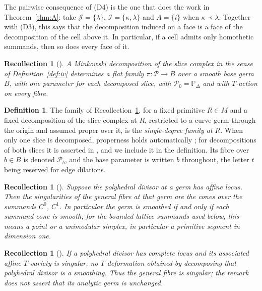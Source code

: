 \documentclass[11pt]{amsart}
\newtheorem{recollection}[theorem]{Recollection}
\theoremstyle{definition}
\newtheorem{definition}[theorem]{Definition}
\theoremstyle{remark}
\theoremstyle{plain}
\newcommand{\PP}{\mathbb{P}}
\newcommand{\cP}{\mathcal{P}}
\begin{document}
The pairwise consequence of (D4) is the one that does the work in
Theorem~\ref{thm:A}: take $\mathcal J=\{\lambda\}$,
$\mathcal I=\{\kappa,\lambda\}$ and $A=\{i\}$ when
$\kappa\prec\lambda$.  Together with (D3), this says that the decomposition
induced on a face is a face of the decomposition of the cell above it.  In
particular, if a cell admits only homothetic summands, then so does every face
of it.

\begin{recollection}[{\cite[Thm.~4.4]{IV12}}]\label{thm:iv44}
A Minkowski decomposition of the slice complex in the sense of
Definition~\ref{def:iv} determines a flat family
$\pi \colon \cP \to B$ over a smooth base germ $B$, with one parameter for each
decomposed slice, with $\cP_0 = \PP_\Delta$ and with $T$-action on every fibre.
\end{recollection}

\begin{definition}\label{def:singledegree}
The family of Recollection~\ref{thm:iv44}, for a fixed primitive $R \in M$ and a
fixed decomposition of the slice complex at $R$, restricted to a curve germ
through the origin and assumed proper over it, is the \emph{single-degree
family at $R$}.  When only one slice is decomposed, properness holds
automatically \cite[Thm.~3.2]{HI11}; for decompositions of both slices it is
asserted in \cite[Rem.~3.3]{HI11}, and we include it in the definition.  Its fibre over $b\in B$ is denoted $\cP_b$, and the base
parameter is written $b$ throughout, the letter $t$ being reserved for edge
dilations.
\end{definition}


\begin{recollection}[{\cite[Cor.~2.12]{IV12}}]\label{thm:cor212}
Suppose the polyhedral divisor at a germ has \emph{affine locus}.  Then the
singularities of the general fibre at that germ are the cones over the summands
$C^0$, $C^1$.  In particular the germ is smoothed if and only if each summand
cone is smooth; for the bounded lattice summands used below, this means a point
or a unimodular simplex, in particular a primitive segment in dimension one.
\end{recollection}

\begin{recollection}[{\cite[Rem.~2.13]{IV12}}]\label{thm:rem213}
If a polyhedral divisor has \emph{complete locus} and its associated affine
$T$-variety is singular, no $T$-deformation obtained by decomposing that
polyhedral divisor is a smoothing.  Thus the general fibre is singular; the
remark does not assert that its analytic germ is unchanged.
\end{recollection}
\end{document}
